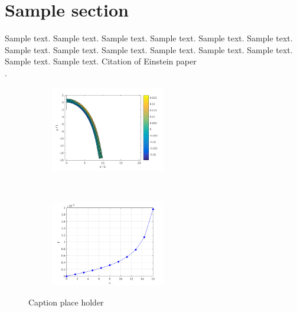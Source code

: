 \section{Sample section}
\label{sec1}

Sample text. Sample text. Sample text. Sample text. Sample text. Sample text. 
Sample text. Sample text. Sample text. Sample text. Sample text. Sample text. 
Sample text. Sample text. Citation of Einstein paper~ \\\citet{01_B_LagrMech}. \\
\begin{figure}[h]
    \centering
    \begin{subfigure}[t]{0.5\textwidth}
        \centering
        \includegraphics[width=5cm]{data/a}
        \caption{}\label{a}
    \end{subfigure}%
    ~ 
    \begin{subfigure}[t]{0.5\textwidth}
        \centering
        \includegraphics[width=5cm]{data/b}
        \caption{}\label{b}
    \end{subfigure}
    \caption{Caption place holder  } \label{fig}
\end{figure}
\\
\\
\citet{01_SotA_cohes_dyn} \\
\citet{02_SotA_cohes} \\
\citet{03_SotA_virtClos} \\
\citet{01_PF_dyn_brittle} \\
\citet{02_PF_HO_brittle} \\
\citet{03_PF_ductile} \\
\citet{04_PF_HO_finDef} \\
\citet{05_PF_ductile} \\
\citet{06_PF_ductile}

